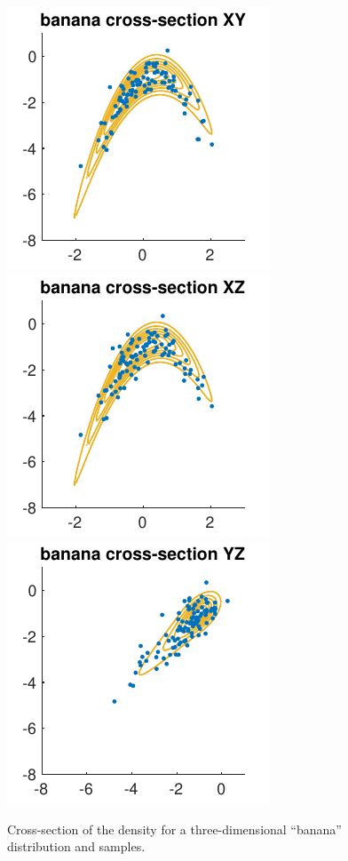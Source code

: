 \documentclass[10pt]{article}
\begin{document}
\begin{figure}[t]
\centering
\includegraphics{images/banana3D_sivi_ContourSamples_XY.pdf}
\includegraphics{images/banana3D_sivi_ContourSamples_XZ.pdf}
\includegraphics{images/banana3D_sivi_ContourSamples_YZ.pdf}
\caption{Cross-section of the density for a three-dimensional ``banana'' distribution and samples. \todo}
\label{fig:3Dbanana}
\end{figure}
\end{document}
